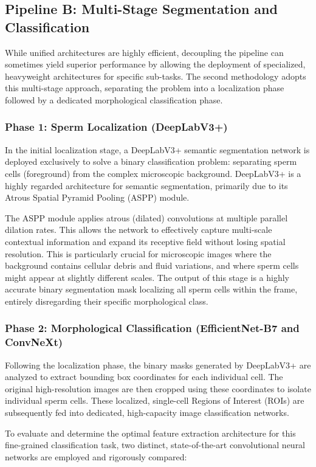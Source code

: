\subsection{Pipeline B: Multi-Stage Segmentation and Classification}
While unified architectures are highly efficient, decoupling the pipeline can sometimes yield superior performance by allowing the deployment of specialized, heavyweight architectures for specific sub-tasks. The second methodology adopts this multi-stage approach, separating the problem into a localization phase followed by a dedicated morphological classification phase.

\subsubsection{Phase 1: Sperm Localization (DeepLabV3+)}
In the initial localization stage, a DeepLabV3+ semantic segmentation network is deployed exclusively to solve a binary classification problem: separating sperm cells (foreground) from the complex microscopic background. DeepLabV3+ is a highly regarded architecture for semantic segmentation, primarily due to its Atrous Spatial Pyramid Pooling (ASPP) module. 

The ASPP module applies atrous (dilated) convolutions at multiple parallel dilation rates. This allows the network to effectively capture multi-scale contextual information and expand its receptive field without losing spatial resolution. This is particularly crucial for microscopic images where the background contains cellular debris and fluid variations, and where sperm cells might appear at slightly different scales. The output of this stage is a highly accurate binary segmentation mask localizing all sperm cells within the frame, entirely disregarding their specific morphological class.

\subsubsection{Phase 2: Morphological Classification (EfficientNet-B7 and ConvNeXt)}
Following the localization phase, the binary masks generated by DeepLabV3+ are analyzed to extract bounding box coordinates for each individual cell. The original high-resolution images are then cropped using these coordinates to isolate individual sperm cells. These localized, single-cell Regions of Interest (ROIs) are subsequently fed into dedicated, high-capacity image classification networks. 

To evaluate and determine the optimal feature extraction architecture for this fine-grained classification task, two distinct, state-of-the-art convolutional neural networks are employed and rigorously compared:

